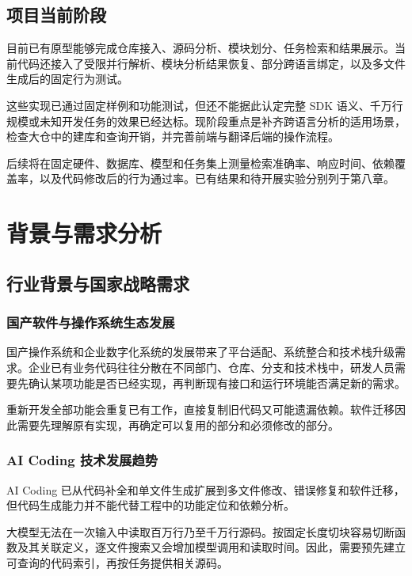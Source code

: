 \section{项目当前阶段}

目前已有原型能够完成仓库接入、源码分析、模块划分、任务检索和结果展示。当前代码还接入了受限并行解析、模块分析结果恢复、部分跨语言绑定，以及多文件生成后的固定行为测试。

这些实现已通过固定样例和功能测试，但还不能据此认定完整 SDK 语义、千万行规模或未知开发任务的效果已经达标。现阶段重点是补齐跨语言分析的适用场景，检查大仓中的建库和查询开销，并完善前端与翻译后端的操作流程。

后续将在固定硬件、数据库、模型和任务集上测量检索准确率、响应时间、依赖覆盖率，以及代码修改后的行为通过率。已有结果和待开展实验分别列于第八章。

\chapter{背景与需求分析}
\label{chap:requirements}

\section{行业背景与国家战略需求}

\subsection{国产软件与操作系统生态发展}

国产操作系统和企业数字化系统的发展带来了平台适配、系统整合和技术栈升级需求。企业已有业务代码往往分散在不同部门、仓库、分支和技术栈中，研发人员需要先确认某项功能是否已经实现，再判断现有接口和运行环境能否满足新的需求。

重新开发全部功能会重复已有工作，直接复制旧代码又可能遗漏依赖。软件迁移因此需要先理解原有实现，再确定可以复用的部分和必须修改的部分。

\subsection{AI Coding 技术发展趋势}

AI Coding 已从代码补全和单文件生成扩展到多文件修改、错误修复和软件迁移，但代码生成能力并不能代替工程中的功能定位和依赖分析。

大模型无法在一次输入中读取百万行乃至千万行源码。按固定长度切块容易切断函数及其关联定义，逐文件搜索又会增加模型调用和读取时间。因此，需要预先建立可查询的代码索引，再按任务提供相关源码。

